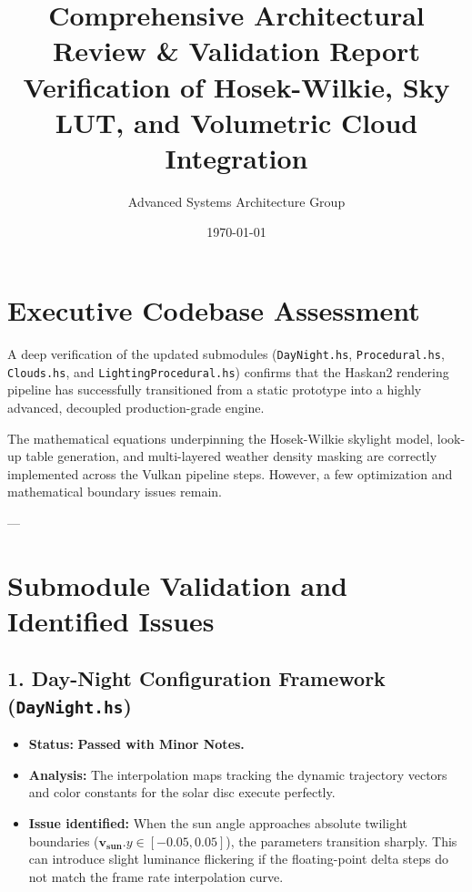 \documentclass[11pt,a4paper]{article}
\title{Comprehensive Architectural Review \& Validation Report \\ \large Verification of Hosek-Wilkie, Sky LUT, and Volumetric Cloud Integration}
\author{Advanced Systems Architecture Group}
\date{\today}
\begin{document}
\maketitle

\section{Executive Codebase Assessment}
A deep verification of the updated submodules (\texttt{DayNight.hs}, \texttt{Procedural.hs}, \texttt{Clouds.hs}, and \texttt{LightingProcedural.hs}) confirms that the Haskan2 rendering pipeline has successfully transitioned from a static prototype into a highly advanced, decoupled production-grade engine. 

The mathematical equations underpinning the Hosek-Wilkie skylight model, look-up table generation, and multi-layered weather density masking are correctly implemented across the Vulkan pipeline steps. However, a few optimization and mathematical boundary issues remain.

---

\section{Submodule Validation and Identified Issues}

\subsection{1. Day-Night Configuration Framework (\texttt{DayNight.hs})}
\begin{itemize}
    \item \textbf{Status:} \textbf{Passed with Minor Notes.}
    \item \textbf{Analysis:} The interpolation maps tracking the dynamic trajectory vectors and color constants for the solar disc execute perfectly. 
    \item \textbf{Issue identified:} When the sun angle approaches absolute twilight boundaries ($\mathbf{v_{\text{sun}}}.y \in [-0.05, 0.05]$), the parameters transition sharply. This can introduce slight luminance flickering if the floating-point delta steps do not match the frame rate interpolation curve.
\end{itemize}
\end{document}
